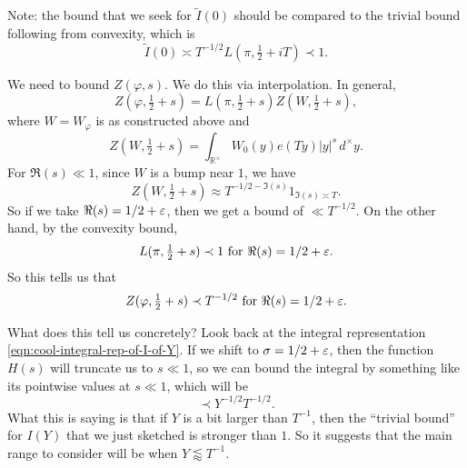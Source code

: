 \documentclass[reqno]{amsart} 
\begin{document}
Note: the bound that we seek for $\tilde{I}(0)$ should be compared to the trivial bound following from convexity, which is
\begin{equation*}
  \tilde{I}(0) \asymp T^{-1/2} L(\pi, \tfrac{1}{2} + iT) \prec 1.
\end{equation*}


We need to bound $Z(\varphi,s)$.  We do this via interpolation.  In general,
\begin{equation*}
  Z(\varphi,\tfrac{1}{2} + s) = L(\pi, \tfrac{1}{2} + s) Z(W, \tfrac{1}{2} + s),
\end{equation*}
where $W = W_\varphi$ is as constructed above and
\begin{equation*}
  Z(W, \tfrac{1}{2} + s) = \int _{\mathbb{R}^\times } W_0(y) e(T y) \lvert y \rvert ^s \, d ^\times y.
\end{equation*}
For $\Re(s) \ll 1$, since $W$ is a bump near $1$, we have
\begin{equation*}
  Z(W,\tfrac{1}{2} + s) \approx T^{-1/2 - \Im(s)} 1_{\Im(s) \asymp T}.
\end{equation*}
So if we take $\Re(s) = 1/2 + \varepsilon$, then we get a bound of $\ll T^{-1/2}$.  On the other hand, by the convexity bound,
\begin{equation*}
  L(\pi, \tfrac{1}{2} + s) \prec 1 \text{ for } \Re(s) = 1/2 + \varepsilon.
\end{equation*}
So this tells us that
\begin{equation*}
  Z(\varphi, \tfrac{1}{2} + s) \prec T^{-1/2} \text{ for } \Re(s) = 1/2 + \varepsilon.
\end{equation*}

What does this tell us concretely?  Look back at the integral representation \eqref{eqn:cool-integral-rep-of-I-of-Y}.  If we shift to $\sigma = 1/2 + \varepsilon$, then the function $H(s)$ will truncate us to $s \ll 1$, so we can bound the integral by something like its pointwise values at $s \ll 1$, which will be
\begin{equation*}
  \prec Y^{-1/2} T^{-1/2}.
\end{equation*}
What this is saying is that if $Y$ is a bit larger than $T^{-1}$, then the ``trivial bound'' for $I(Y)$ that we just sketched is stronger than $1$.  So it suggests that the main range to consider will be when $Y \lessapprox T^{-1}$.
\end{document}
